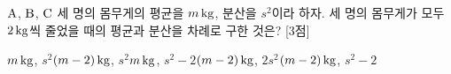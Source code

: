 $\mathrm{A}$, $\mathrm{B}$, $\mathrm{C}$ 세 명의 몸무게의 평균을 $m\mkern3mu \mathrm{kg}$, 분산을 $s^2$이라 하자. 세 명의 몸무게가 모두 $2\mkern3mu \mathrm{kg}$씩 줄었을 때의 평균과 분산을 차례로 구한 것은? \mbox{[3점]}
\begin{choicesii}{$m\mkern3mu \mathrm{kg}$, $s^2$}{$(m-2)\mkern3mu \mathrm{kg}$, $s^2$}{$m\mkern3mu \mathrm{kg}$, $s^2-2$}{$(m-2)\mkern3mu \mathrm{kg}$, $2s^2$}{$(m-2)\mkern3mu \mathrm{kg}$, $s^2-2$}\end{choicesii}
